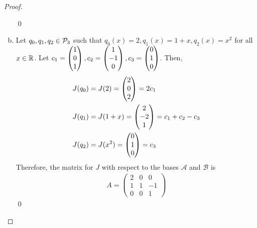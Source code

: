 \begin{proof}
\begin{enumerate}[(a)]
\[        \]\qed
        \item Let $q_0,q_1,q_2\in\P_3$ such that $q_0(x)=2,q_1(x)=1+x,q_2(x)=x^2$ for all $x\in\R$. 
        Let $c_1=\ColVecThree{1}{0}{1},c_2=\ColVecThree{1}{-1}{0},c_3=\ColVecThree{0}{1}{0}$.
        Then, 
        \[
            \begin{aligned}
                &J(q_0)=J(2)=\ColVecThree{2}{0}{2}=2c_1\\
                &J(q_1)=J(1+x)=\ColVecThree{2}{-2}{1}=c_1+c_2-c_3\\
                &J(q_2)=J(x^2)=\ColVecThree{0}{1}{0}=c_3
            \end{aligned}
        \]
        Therefore, the matrix for $J$ with respect to the bases $\mathcal{A}$ and $\mathcal{B}$ is 
        \[
            \begin{aligned}
                A=\begin{pmatrix}
                    2 & 0 & 0 \\
                    1 & 1 & -1\\
                    0 & 0 & 1
                \end{pmatrix}
            \end{aligned}
        \]\qed
    \end{enumerate}
    \renewcommand{\qedsymbol}{}
\end{proof}